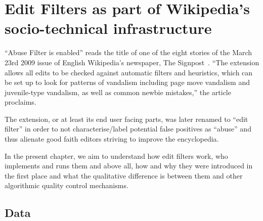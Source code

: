 \chapter{Edit Filters as part of Wikipedia's socio-technical infrastructure}
\label{chap:filters}


``Abuse Filter is enabled'' reads the title of one of the eight stories of the March 23rd 2009 issue of English Wikipedia's newspaper, The Signpost~\cite{Signpost2009}.
``The extension allows all edits to be checked against automatic filters and heuristics, which can be set up to look for patterns of vandalism including page move vandalism and juvenile-type vandalism, as well as common newbie mistakes,'' the article proclaims.

The extension, or at least its end user facing parts, was later renamed to ``edit filter'' in order to not characterise/label potential false positives as ``abuse'' and thus alienate good faith editors striving to improve the encyclopedia.

In the present chapter, we aim to understand how edit filters work, who implements and runs them and above all, how and why they were introduced in the first place and what the qualitative difference is between them and other algorithmic quality control mechanisms.

\section{Data}

